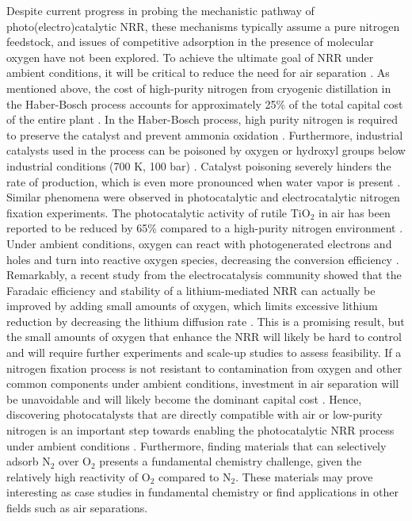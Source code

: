 Despite current progress in probing the mechanistic pathway of photo(electro)catalytic NRR, these mechanisms typically assume a pure nitrogen feedstock, and issues of competitive adsorption in the presence of molecular oxygen have not been explored. To achieve the ultimate goal of NRR under ambient conditions, it will be critical to reduce the need for air separation \cite{Comer2019ProspectsFertilizers}. As mentioned above, the cost of high-purity nitrogen from cryogenic distillation in the Haber-Bosch process accounts for approximately 25\% of the total capital cost of the entire plant \cite{Bartels2008AEconomy}. In the Haber-Bosch process, high purity nitrogen is required to preserve the catalyst and prevent ammonia oxidation \cite{smith_2020}. Furthermore, industrial catalysts used in the process can be poisoned by oxygen or hydroxyl groups below industrial conditions (700 K, 100 bar) \cite{Appl2011AmmoniaProcesses, Rohr2019ACatalysts}. Catalyst poisoning severely hinders the rate of production, which is even more pronounced when water vapor is present \cite{Appl2011AmmoniaProcesses}. Similar phenomena were observed in photocatalytic and electrocatalytic nitrogen fixation experiments. The photocatalytic activity of rutile TiO$_2$ in air has been reported to be reduced by 65\% compared to a high-purity nitrogen environment \cite{Hirakawa_2017}. Under ambient conditions, oxygen can react with photogenerated electrons and holes and turn into reactive oxygen species, decreasing the conversion efficiency \cite{Ye2017Ni2PLight, Huang2020TowardLigands, Comer2018}. Remarkably, a recent study from the electrocatalysis community showed that the Faradaic efficiency and stability of a lithium-mediated NRR can actually be improved by adding small amounts of oxygen, which limits excessive lithium reduction by decreasing the lithium diffusion rate \cite{Li2021EnhancementOxygen}. This is a promising result, but the small amounts of oxygen that enhance the NRR will likely be hard to control and will require further experiments and scale-up studies to assess feasibility. If a nitrogen fixation process is not resistant to contamination from oxygen and other common components under ambient conditions, investment in air separation will be unavoidable and will likely become the dominant capital cost \cite{Comer2019ProspectsFertilizers}. Hence, discovering photocatalysts that are directly compatible with air or low-purity nitrogen is an important step towards enabling the photocatalytic NRR process under ambient conditions \cite{Liu2022ProspectsFixation, Comer2019ProspectsFertilizers}. Furthermore, finding materials that can selectively adsorb N$_2$ over O$_2$ presents a fundamental chemistry challenge, given the relatively high reactivity of O$_2$ compared to N$_2$. These materials may prove interesting as case studies in fundamental chemistry or find applications in other fields such as air separations.


